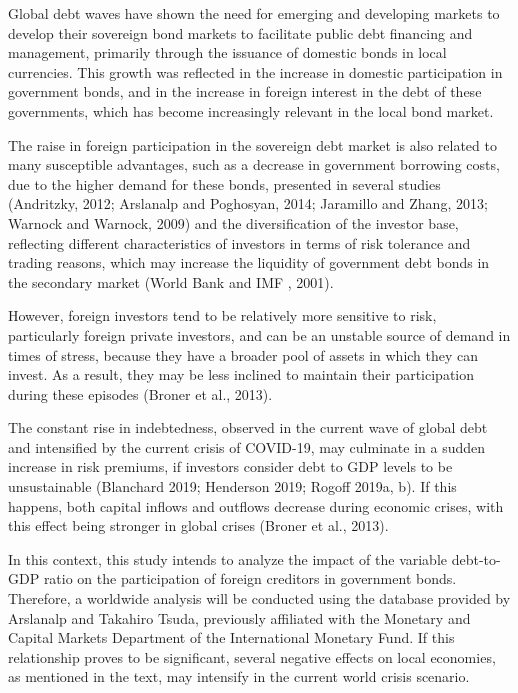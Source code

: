 \documentclass[]{article}
\begin{document}
Global debt waves have shown the need for emerging and developing
markets to develop their sovereign bond markets to facilitate public
debt financing and management, primarily through the issuance of
domestic bonds in local currencies. This growth was reflected in the
increase in domestic participation in government bonds, and in the
increase in foreign interest in the debt of these governments, which has
become increasingly relevant in the local bond market.

The raise in foreign participation in the sovereign debt market is also
related to many susceptible advantages, such as a decrease in government
borrowing costs, due to the higher demand for these bonds, presented in
several studies (Andritzky, 2012; Arslanalp and Poghosyan, 2014;
Jaramillo and Zhang, 2013; Warnock and Warnock, 2009) and the
diversification of the investor base, reflecting different
characteristics of investors in terms of risk tolerance and trading
reasons, which may increase the liquidity of government debt bonds in
the secondary market (World Bank and IMF , 2001).

However, foreign investors tend to be relatively more sensitive to risk,
particularly foreign private investors, and can be an unstable source of
demand in times of stress, because they have a broader pool of assets in
which they can invest. As a result, they may be less inclined to
maintain their participation during these episodes (Broner et al.,
2013).

The constant rise in indebtedness, observed in the current wave of
global debt and intensified by the current crisis of COVID-19, may
culminate in a sudden increase in risk premiums, if investors consider
debt to GDP levels to be unsustainable (Blanchard 2019; Henderson 2019;
Rogoff 2019a, b). If this happens, both capital inflows and outflows
decrease during economic crises, with this effect being stronger in
global crises (Broner et al., 2013).

In this context, this study intends to analyze the impact of the
variable debt-to-GDP ratio on the participation of foreign creditors in
government bonds. Therefore, a worldwide analysis will be conducted
using the database provided by Arslanalp and Takahiro Tsuda, previously
affiliated with the Monetary and Capital Markets Department of the
International Monetary Fund. If this relationship proves to be
significant, several negative effects on local economies, as mentioned
in the text, may intensify in the current world crisis scenario.
\end{document}
